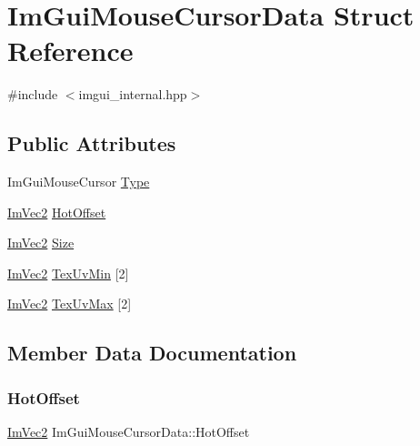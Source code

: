 \hypertarget{struct_im_gui_mouse_cursor_data}{}\section{Im\+Gui\+Mouse\+Cursor\+Data Struct Reference}
\label{struct_im_gui_mouse_cursor_data}


{\ttfamily \#include $<$imgui\+\_\+internal.\+hpp$>$}

\subsection*{Public Attributes}
\begin{DoxyCompactItemize}
\item 
Im\+Gui\+Mouse\+Cursor \hyperlink{struct_im_gui_mouse_cursor_data_ab58df812a8caf8741415053515b8f347}{Type}
\item 
\hyperlink{struct_im_vec2}{Im\+Vec2} \hyperlink{struct_im_gui_mouse_cursor_data_ae271e8ec495657c2231d6e47540d3b36}{Hot\+Offset}
\item 
\hyperlink{struct_im_vec2}{Im\+Vec2} \hyperlink{struct_im_gui_mouse_cursor_data_af8dd3ec3de77811d6caf4bfdde085495}{Size}
\item 
\hyperlink{struct_im_vec2}{Im\+Vec2} \hyperlink{struct_im_gui_mouse_cursor_data_add35adb991fcfd03ae33c3607aa0c842}{Tex\+Uv\+Min} \mbox{[}2\mbox{]}
\item 
\hyperlink{struct_im_vec2}{Im\+Vec2} \hyperlink{struct_im_gui_mouse_cursor_data_a30bae90a9e61608c4fd9fe03b5f7390f}{Tex\+Uv\+Max} \mbox{[}2\mbox{]}
\end{DoxyCompactItemize}


\subsection{Member Data Documentation}
\hypertarget{struct_im_gui_mouse_cursor_data_ae271e8ec495657c2231d6e47540d3b36}{}\label{struct_im_gui_mouse_cursor_data_ae271e8ec495657c2231d6e47540d3b36} 
\subsubsection{\texorpdfstring{Hot\+Offset}{HotOffset}}
{\footnotesize\ttfamily \hyperlink{struct_im_vec2}{Im\+Vec2} Im\+Gui\+Mouse\+Cursor\+Data\+::\+Hot\+Offset}

